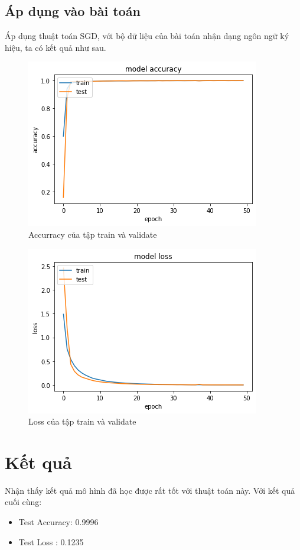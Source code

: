 \subsection{Áp dụng vào bài toán}
Áp dụng thuật toán SGD, với bộ dữ liệu của bài toán nhận dạng ngôn ngữ ký hiệu, ta có kết quả như sau.
\FloatBarrier
\begin{figure}[htp]
\begin{center}
\includegraphics[scale=1]{chap4/c4_figs/train_val_acc.png}
\end{center}
\caption{Accurracy của tập train và validate}
\label{fig:pipelineS}
\end{figure}
\FloatBarrier

\FloatBarrier
\begin{figure}[htp]
\begin{center}
\includegraphics[scale=1]{chap4/c4_figs/train_val_l.png}
\end{center}
\caption{Loss của tập train và validate}
\label{fig:pipelineS}
\end{figure}
\FloatBarrier

\section{Kết quả}

Nhận thấy kết quả mô hình đã học được rất tốt với thuật toán này. Với kết quả cuối cùng:
\begin{itemize}
\item Test Accuracy: 0.9996
\item Test Loss    : 0.1235 
\end{itemize}


















